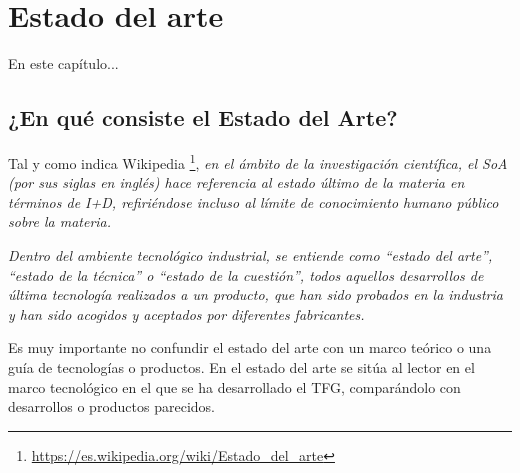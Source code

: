 \chapter{Estado del arte}

En este capítulo...


\section{¿En qué consiste el Estado del Arte?}

Tal y como indica Wikipedia \footnote{\url{https://es.wikipedia.org/wiki/Estado_del_arte}}, \textit{en el ámbito de la investigación científica, el SoA (por sus siglas en inglés) hace referencia al estado último de la materia en términos de I+D, refiriéndose incluso al límite de conocimiento humano público sobre la materia.}

\textit{Dentro del ambiente tecnológico industrial, se entiende como ``estado del arte'', ``estado de la técnica'' o ``estado de la cuestión'', todos aquellos desarrollos de última tecnología realizados a un producto, que han sido probados en la industria y han sido acogidos y aceptados por diferentes fabricantes.}


Es muy importante no confundir el estado del arte con un marco teórico o una guía de tecnologías o productos. En el estado del arte se sitúa al lector en el marco tecnológico en el que se ha desarrollado el TFG, comparándolo con desarrollos o productos parecidos.